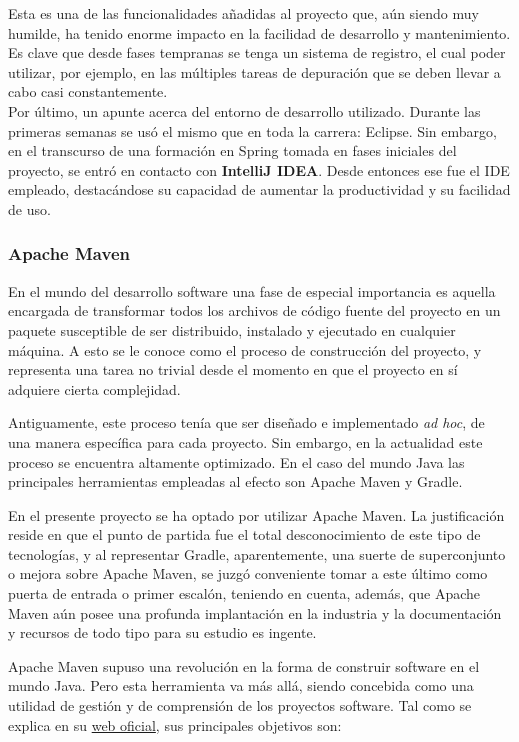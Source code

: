 \documentclass[a4paper]{article}
\begin{document}
    Esta es una de las funcionalidades añadidas al proyecto que, aún siendo muy humilde, ha tenido enorme impacto en la facilidad de desarrollo y mantenimiento. Es clave que desde fases tempranas se tenga un sistema de registro, el cual poder utilizar, por ejemplo, en las múltiples tareas de depuración que se deben llevar a cabo casi constantemente.
    \\
    
    Por último, un apunte acerca del entorno de desarrollo utilizado. Durante las primeras semanas se usó el mismo que en toda la carrera: Eclipse. Sin embargo, en el transcurso de una formación en Spring tomada en fases iniciales del proyecto, se entró en contacto con \textbf{IntelliJ IDEA}. Desde entonces ese fue el IDE empleado, destacándose su capacidad de aumentar la productividad y su facilidad de uso.
    
    \subsubsection{Apache Maven}
    En el mundo del desarrollo software una fase de especial importancia es aquella encargada de transformar todos los archivos de código fuente del proyecto en un paquete susceptible de ser distribuido, instalado y ejecutado en cualquier máquina. A esto se le conoce como el proceso de construcción del proyecto, y representa una tarea no trivial desde el momento en que el proyecto en sí adquiere cierta complejidad.
    
    Antiguamente, este proceso tenía que ser diseñado e implementado \emph{ad hoc}, de una manera específica para cada proyecto. Sin embargo, en la actualidad este proceso se encuentra altamente optimizado. En el caso del mundo Java las principales herramientas empleadas al efecto son Apache Maven y Gradle.
    
    En el presente proyecto se ha optado por utilizar Apache Maven. La justificación reside en que el punto de partida fue el total desconocimiento de este tipo de tecnologías, y al representar Gradle, aparentemente, una suerte de superconjunto o mejora sobre Apache Maven, se juzgó conveniente tomar a este último como puerta de entrada o primer escalón, teniendo en cuenta, además, que Apache Maven aún posee una profunda implantación en la industria y la documentación y recursos de todo tipo para su estudio es ingente.
    
    Apache Maven supuso una revolución en la forma de construir software en el mundo Java. Pero esta herramienta va más allá, siendo concebida como una utilidad de gestión y de comprensión de los proyectos software. Tal como se explica en su \href{https://maven.apache.org/what-is-maven.html}{web oficial}, sus principales objetivos son:
    
\end{document}
